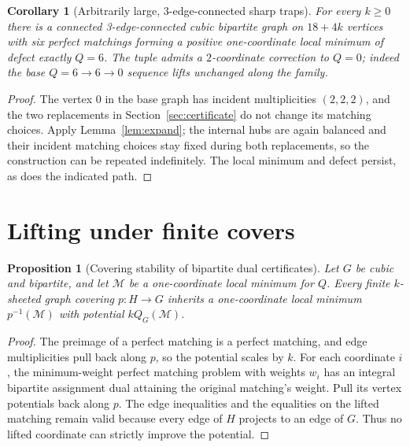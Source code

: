 \documentclass[11pt]{article}
\newtheorem{proposition}[theorem]{Proposition}
\newtheorem{corollary}[theorem]{Corollary}
\begin{document}
\begin{corollary}[Arbitrarily large, 3-edge-connected sharp traps]
For every $k\ge0$ there is a connected 3-edge-connected cubic
bipartite graph on $18+4k$ vertices with six perfect matchings
forming a positive one-coordinate local minimum of defect
exactly $Q=6$. The tuple admits a $2$-coordinate correction
to $Q=0$; indeed the base $Q=6\to6\to0$ sequence lifts
unchanged along the family.
\end{corollary}
\begin{proof}
The vertex $0$ in the base graph has incident multiplicities
$(2,2,2)$, and the two replacements in Section~\ref{sec:certificate}
do not change its matching choices. Apply
Lemma~\ref{lem:expand}; the internal hubs are again balanced
and their incident matching choices stay fixed during both
replacements, so the construction can be repeated indefinitely.
The local minimum and defect persist, as does the indicated path.
\end{proof}

\section{Lifting under finite covers}
\begin{proposition}[Covering stability of bipartite dual certificates]
Let $G$ be cubic and bipartite, and let $\mathcal M$ be a
one-coordinate local minimum for $Q$. Every finite
$k$-sheeted graph covering $p:H\to G$ inherits a one-coordinate
local minimum $p^{-1}(\mathcal M)$ with potential $kQ_G(\mathcal M)$.
\end{proposition}
\begin{proof}
The preimage of a perfect matching is a perfect matching, and
edge multiplicities pull back along $p$, so the potential scales
by $k$. For each coordinate $i$, the minimum-weight perfect
matching problem with weights $w_i$ has an integral bipartite
assignment dual attaining the original matching's weight.
Pull its vertex potentials back along $p$. The edge inequalities
and the equalities on the lifted matching remain valid because
every edge of $H$ projects to an edge of $G$. Thus no lifted
coordinate can strictly improve the potential.
\end{proof}
\end{document}
